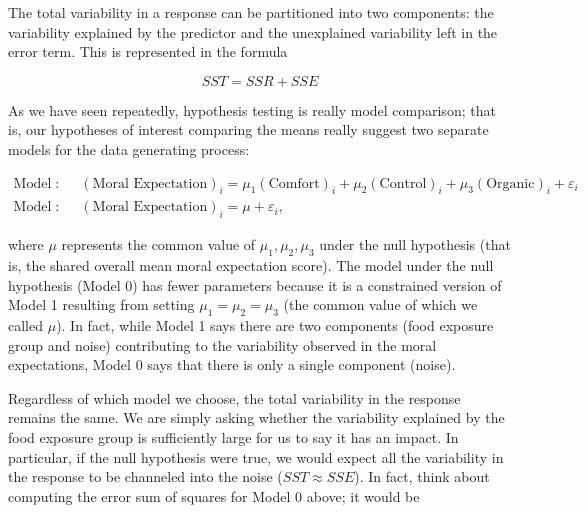 \documentclass[
  letterpaper,
  DIV=11,
  numbers=noendperiod]{scrreprt}
\theoremstyle{plain}
\theoremstyle{definition}
\theoremstyle{definition}
\theoremstyle{remark}
\begin{document}
\begin{tcolorbox}[enhanced jigsaw, breakable, titlerule=0mm, colframe=quarto-callout-tip-color-frame, bottomtitle=1mm, opacityback=0, rightrule=.15mm, toptitle=1mm, arc=.35mm, bottomrule=.15mm, left=2mm, title=\textcolor{quarto-callout-tip-color}{\faLightbulb}\hspace{0.5em}{Big Idea}, leftrule=.75mm, coltitle=black, toprule=.15mm, colbacktitle=quarto-callout-tip-color!10!white, colback=white, opacitybacktitle=0.6]

The total variability in a response can be partitioned into two
components: the variability explained by the predictor and the
unexplained variability left in the error term. This is represented in
the formula

\[SST = SSR + SSE\]

\end{tcolorbox}

As we have seen repeatedly, hypothesis testing is really model
comparison; that is, our hypotheses of interest comparing the means
really suggest two separate models for the data generating process:

\[
\begin{aligned}
  \text{Model 1}:& \quad (\text{Moral Expectation})_i = \mu_1 (\text{Comfort})_i + \mu_2 (\text{Control})_i + \mu_3 (\text{Organic})_i + \varepsilon_i \\
  \text{Model 0}:& \quad (\text{Moral Expectation})_i = \mu + \varepsilon_i,
\end{aligned}
\]

where \(\mu\) represents the common value of \(\mu_1, \mu_2, \mu_3\)
under the null hypothesis (that is, the shared overall mean moral
expectation score). The model under the null hypothesis (Model 0) has
fewer parameters because it is a constrained version of Model 1
resulting from setting \(\mu_1 = \mu_2 = \mu_3\) (the common value of
which we called \(\mu\)). In fact, while Model 1 says there are two
components (food exposure group and noise) contributing to the
variability observed in the moral expectations, Model 0 says that there
is only a single component (noise).

Regardless of which model we choose, the total variability in the
response remains the same. We are simply asking whether the variability
explained by the food exposure group is sufficiently large for us to say
it has an impact. In particular, if the null hypothesis were true, we
would expect all the variability in the response to be channeled into
the noise (\(SST \approx SSE\)). In fact, think about computing the
error sum of squares for Model 0 above; it would be
\end{document}
